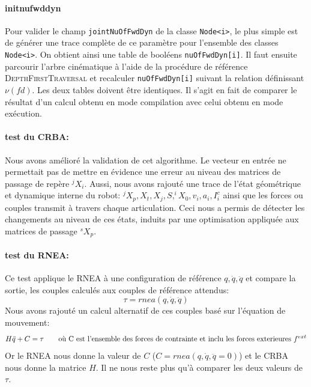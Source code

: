 \documentclass{report}
\begin{document}
\paragraph{initnufwddyn}
Pour valider le champ \verb;jointNuOfFwdDyn; de la classe \verb;Node<i>;, le plus simple est de générer une trace complète de ce paramètre pour l'ensemble des classes \verb;Node<i>;. On obtient ainsi une table de booléens \verb;nuOfFwdDyn[i];. Il faut ensuite parcourir l'arbre cinématique à l'aide de la procédure de référence \textsc{DepthFirstTraversal} et recalculer \verb;nuOfFwdDyn[i]; suivant la relation définissant $\nu(fd)$. Les deux tables doivent être identiques. Il s'agit en fait de comparer le résultat d'un calcul obtenu en mode compilation avec celui obtenu en mode exécution.

\paragraph{test du CRBA:}
Nous avons amélioré la validation de  cet algorithme. Le vecteur en entrée ne permettait pas de mettre en évidence une erreur au niveau des matrices de passage de repère $^jX_i$. Aussi, nous avons rajouté une trace de l'état géométrique et dynamique interne du robot: $^jX_p, X_t, X_j, S, ^iX_0, v_i, a_i, I_i^c$ ainsi que les forces ou couples transmit à travers chaque articulation. Ceci nous a permis de détecter les changements au niveau de ces états, induits par une optimisation appliquée aux matrices de passage $^sX_p$.

\paragraph{test du RNEA:}
Ce test applique le RNEA à une configuration de référence $q, \dot{q}, \ddot{q}$ et compare la sortie, \cad les couples calculés aux couples de référence attendus:
\begin{equation*}
\tau = rnea(q,\dot{q},\ddot{q})
\end{equation*}
Nous avons rajouté un calcul alternatif de ces couples basé sur l'équation de mouvement:
\begin{equation*}
H \ddot{q} + C = \tau \qquad \textnormal{où C est l'ensemble des forces de contrainte et inclu les forces exterieures $f^{ext}$}
\end{equation*}  
Or le RNEA nous donne la valeur de $C$ ($C = rnea(q,\dot{q},\ddot{q}=0)$) et le CRBA nous donne la matrice $H$. Il ne nous reste plus qu'à comparer les deux valeurs de $\tau$.
\end{document}
